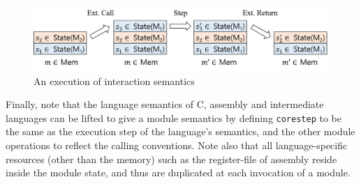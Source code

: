 \begin{figure}[t]
\includegraphics[width=1\linewidth]{images/intersem.png}
\caption{An execution of interaction semantics}
\label{fig:inter-sem}
\end{figure}


Finally, note that the language semantics of C, assembly and
intermediate languages can be lifted to give a module semantics by
defining \texttt{corestep} to be the same as the execution step of the
language's semantics, and the other module operations to reflect the
calling conventions. Note also that all language-specific resources
(\ie other than the memory)
such as the register-file of assembly 
reside inside the module state, and thus are
duplicated at each invocation of a module.

